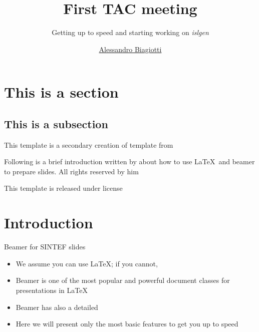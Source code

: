 \documentclass{sintefbeamer}
\title{First TAC meeting}
\subtitle{Getting up to speed and starting working on \textit{islgen}}
\author{\href{mailto:alessandro.biagiotti@ziti.uni-heidelberg.de}{Alessandro Biagiotti}}
\begin{document}
\maketitle

\section{This is a section}

\subsection{This is a subsection}

\begin{frame}

This template is a secondary creation of  template from  \vspace{\baselineskip}

Following is a brief introduction written by  about how to use \LaTeX\ and beamer to prepare slides. All rights reserved by him\vspace{\baselineskip}

This template is released under  license

\end{frame}

\section{Introduction}

\begin{frame}{Beamer for SINTEF slides}{\thesection \, \secname}

\begin{itemize}
\item We assume you can use \LaTeX; if you cannot,
\item Beamer is one of the most popular and powerful document
classes for presentations in \LaTeX
\item Beamer has also a detailed
\item Here we will present only the most basic features to get you up to speed
\end{itemize}
\end{frame}
\end{document}
